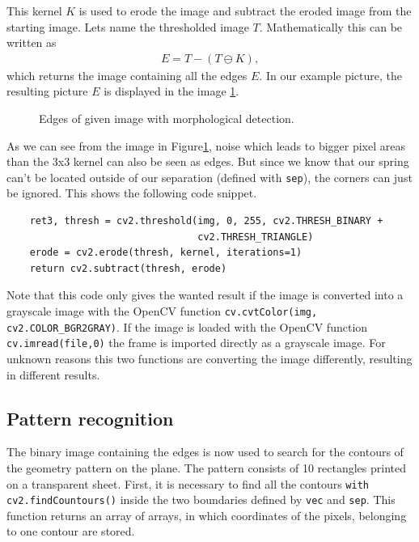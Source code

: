 This kernel $K$ is used to erode the image and subtract the eroded image from the starting image. Lets name the thresholded image $T$. Mathematically this can be written as
\begin{align*}
E = T-(T\ominus K),
\end{align*}
which returns the image containing all the edges $E$. In our example picture, the resulting picture $E$ is displayed in the image \ref{development:edge}.
\begin{figure}[ht]
	\centering
	\caption{Edges of given image with morphological detection.}
	\label{development:edge}
\end{figure}
As we can see from the image in Figure\ref{development:edge}, noise which leads to bigger pixel areas than the 3x3 kernel can also be seen as edges. But since we know that our spring can't be located outside of our separation (defined with \texttt{sep}), the corners can just be ignored.
This shows the following code snippet.
\begin{lstlisting}
	ret3, thresh = cv2.threshold(img, 0, 255, cv2.THRESH_BINARY +
	                             cv2.THRESH_TRIANGLE)
	erode = cv2.erode(thresh, kernel, iterations=1)
	return cv2.subtract(thresh, erode)
\end{lstlisting} 
Note that this code only gives the wanted result if the image is converted into a grayscale image with the OpenCV function \texttt{cv.cvtColor(img, cv2.COLOR\_BGR2GRAY)}.
If the image is loaded with the OpenCV function \texttt{cv.imread(file,0)} the frame is imported directly as a grayscale image. For unknown reasons this two functions are converting the image differently, resulting in different results.

\subsection{Pattern recognition}
The binary image containing the edges is now used to search for the contours of the geometry pattern on the plane.
The pattern consists of 10 rectangles printed on a transparent sheet.
First, it is necessary to find all the contours \texttt{with cv2.findCountours()} inside the two boundaries defined by \texttt{vec} and \texttt{sep}.
This function returns an array of arrays, in which coordinates of the pixels, belonging to one contour are stored.

